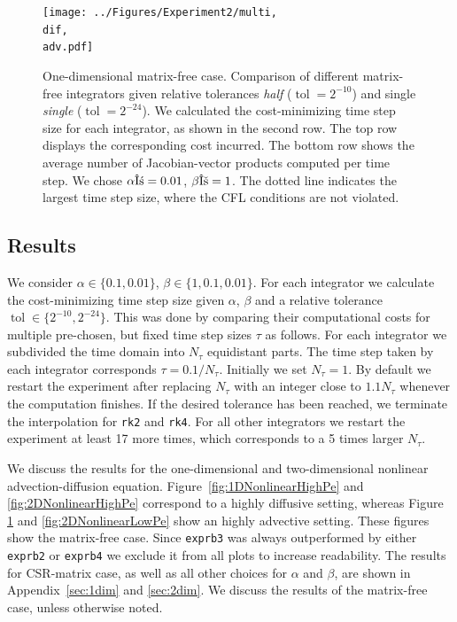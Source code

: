 \documentclass{scrartcl}
\begin{document}
	\begin{figure}[t]
		\newcommand{\dif}{\detokenize{α}=0.01}
		\newcommand{\adv}{\detokenize{β}=1}
		\centering
		\texttt{[image: ../Figures/Experiment2/multi, \\dif, \\adv.pdf]}
		\caption{One-dimensional matrix-free case. Comparison of different matrix-free integrators given relative tolerances \textit{half} ($\operatorname{tol} = 2^{-10}$) and single \textit{single} ($\operatorname{tol} = 2^{-24}$). We calculated the cost-minimizing time step size for each integrator, as shown in the second row. The top row displays the corresponding cost incurred. The bottom row shows the average number of Jacobian-vector products computed per time step. We chose $\alpha\dif$, $\beta\adv$. The dotted line indicates the largest time step size, where the CFL conditions are not violated.}
		\label{fig:1DNonlinearLowPe}
	\end{figure}
	
\subsection{Results} \label{sec:Results}
	We consider $\alpha\in\{0.1,0.01\}$, $\beta\in\{1, 0.1, 0.01\}$. For each integrator we calculate the cost-minimizing time step size given $\alpha$, $\beta$ and a relative tolerance $\operatorname{tol}\in \{2^{-10},2^{-24}\}$. This was done by comparing their computational costs for multiple pre-chosen, but fixed time step sizes $\tau$ as follows. For each integrator we subdivided the time domain into $N_\tau$ equidistant parts. The time step taken by each integrator corresponds $\tau = 0.1/N_\tau$. Initially we set $N_\tau=1$. By default we restart the experiment after replacing $N_\tau$ with an integer close to $1.1N_\tau$ whenever the computation finishes. If the desired tolerance has been reached, we terminate the interpolation for \texttt{rk2} and \texttt{rk4}. For all other integrators we restart the experiment at least 17 more times, which corresponds to a 5 times larger $N_\tau$. 
	
	We discuss the results for the one-dimensional and two-dimensional nonlinear advection-diffusion equation. Figure~\ref{fig:1DNonlinearHighPe} and \ref{fig:2DNonlinearHighPe} correspond to a highly diffusive setting, whereas Figure \ref{fig:1DNonlinearLowPe} and \ref{fig:2DNonlinearLowPe} show an highly advective setting.
	These figures show the matrix-free case. Since \texttt{exprb3} was always outperformed by either \texttt{exprb2} or \texttt{exprb4} we exclude it from all plots to increase readability. The results for CSR-matrix case, as well as all other choices for $\alpha$ and $\beta$, are shown in Appendix~\ref{sec:1dim} and \ref{sec:2dim}. We discuss the results of the matrix-free case, unless otherwise noted.
	
\end{document}
